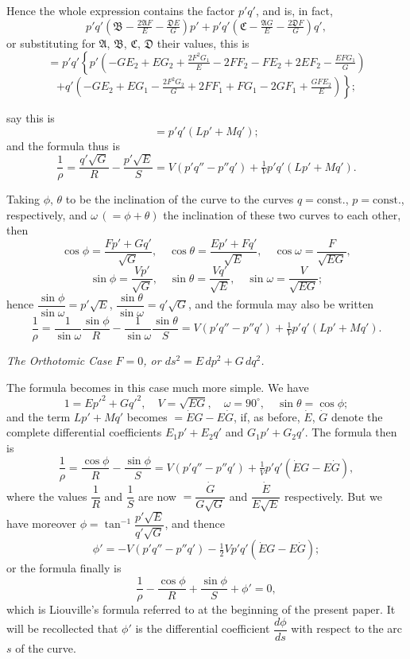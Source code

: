 \documentclass[11pt,a4paper]{article}
\begin{document}
Hence the whole expression contains the factor $p'q'$, and is, in fact,
\[
  p'q'\!\left(\mathfrak{B}-\tfrac{2\mathfrak{A}F}{E}-\tfrac{\mathfrak{D}E}{G}\right)p'+p'q'\!\left(\mathfrak{C}-\tfrac{\mathfrak{A}G}{E}-\tfrac{2\mathfrak{D}F}{G}\right)q',
\]
or substituting for $\mathfrak{A}$, $\mathfrak{B}$, $\mathfrak{C}$, $\mathfrak{D}$ their values, this is
\[
  =p'q'\!\left\{\!p'\!\left(-GE_{2}+EG_{2}+\tfrac{2F^{2}G_{1}}{E}-2FF_{2}-FE_{2}+2EF_{2}-\tfrac{EFG_{1}}{G}\right)\right.
\]
\[
  \left.+q'\!\left(-GE_{2}+EG_{1}-\tfrac{2F^{2}G_{2}}{G}+2FF_{1}+FG_{1}-2GF_{1}+\tfrac{GFE_{2}}{E}\right)\!\right\};
\]

\noindent
say this is
\[
  =p'q'(Lp'+Mq');
\]
and the formula thus is
\[
  \frac{1}{\rho}=\frac{q'\sqrt{G}}{R}-\frac{p'\sqrt{E}}{S}=V(p'q''-p''q')+\tfrac{1}{V}p'q'(Lp'+Mq').
\]

Taking $\phi$, $\theta$ to be the inclination of the curve to the
curves $q=\text{const.}$, $p=\text{const.}$, respectively, and
$\omega\,(=\phi+\theta)$ the inclination of these two curves to each
other, then
\[
  \cos\phi=\frac{Fp'+Gq'}{\sqrt{G}},\quad \cos\theta=\frac{Ep'+Fq'}{\sqrt{E}},\quad \cos\omega=\frac{F}{\sqrt{EG}},
\]
\[
  \sin\phi=\frac{Vp'}{\sqrt{G}},\quad \sin\theta=\frac{Vq'}{\sqrt{E}},\quad \sin\omega=\frac{V}{\sqrt{EG}};
\]
hence $\dfrac{\sin\phi}{\sin\omega}=p'\sqrt{E}$,
$\dfrac{\sin\theta}{\sin\omega}=q'\sqrt{G}$, and the formula may also be written
\[
  \frac{1}{\rho}=\frac{1}{\sin\omega}\frac{\sin\phi}{R}-\frac{1}{\sin\omega}\frac{\sin\theta}{S}
  = V(p'q''-p''q')+\tfrac{1}{V}p'q'(Lp'+Mq').
\]

\begin{center}
\textit{The Orthotomic Case $F=0$, or $d s^{2}=E\,dp^{2}+G\,dq^{2}$.}
\end{center}

The formula becomes in this case much more simple. We have
\[
  1=Ep'^{2}+Gq'^{2},\quad V=\sqrt{EG},\quad \omega=90^{\circ},\quad \sin\theta=\cos\phi;
\]
and the term $Lp'+Mq'$ becomes $=\dot EG-E\dot G$, if, as before,
$\dot E$, $\dot G$ denote the complete differential coefficients
$E_{1}p'+E_{2}q'$ and $G_{1}p'+G_{2}q'$. The formula then is
\[
  \frac{1}{\rho}=\frac{\cos\phi}{R}-\frac{\sin\phi}{S}=V(p'q''-p''q')+\tfrac{1}{V}p'q'(\dot EG-E\dot G),
\]
where the values $\dfrac{1}{R}$ and $\dfrac{1}{S}$ are now
$=\dfrac{\dot G}{G\sqrt{G}}$ and $\dfrac{\dot E}{E\sqrt{E}}$ respectively. But we have
moreover $\phi=\tan^{-1}\dfrac{p'\sqrt{E}}{q'\sqrt{G}}$, and thence
\[
  \phi'=-V(p'q''-p''q')-\tfrac{1}{2}V p'q'(\dot EG-E\dot G);
\]
or the formula finally is
\[
  \frac{1}{\rho}-\frac{\cos\phi}{R}+\frac{\sin\phi}{S}+\phi'=0,
\]
which is Liouville's formula referred to at the beginning of the
present paper. It will be recollected that $\phi'$ is the differential
coefficient $\dfrac{d\phi}{ds}$ with respect to the arc $s$ of the curve.
\end{document}
